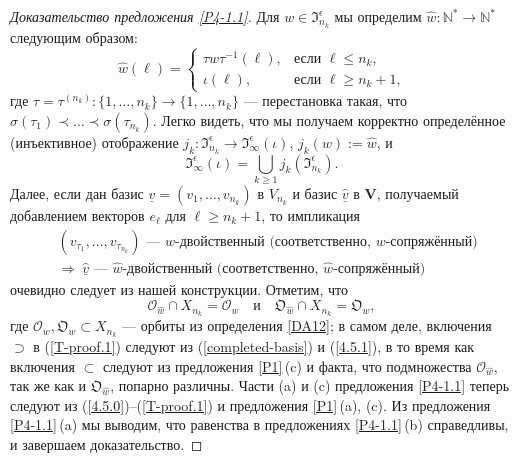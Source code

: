 \documentclass{amsart}
\theoremstyle{definition}
\newcommand{\bs}[1]{\boldsymbol{#1}}
\begin{document}
\begin{proof}[Доказательство предложения \ref{P4-1.1}]
Для $w\in\mathfrak{I}_{n_k}^\epsilon$ мы определим $\hat{w}:\mathbb{N}^*\to\mathbb{N}^*$ следующим образом:
\[\hat{w}(\ell)=\left\{
\begin{array}{ll}
\tau w\tau^{-1}(\ell), & \mbox{если $\ell\leq n_k$,} \\
\iota(\ell), & \mbox{если $\ell\geq n_k+1$,}
\end{array}
\right.\]
где $\tau=\tau^{(n_k)}:\{1,\ldots,n_k\}\to\{1,\ldots,n_k\}$ --- перестановка такая, что $\sigma(\tau_1)\prec\ldots\prec\sigma(\tau_{n_k})$.
Легко видеть, что мы получаем корректно определённое (инъективное) отображение
$j_k:\mathfrak{I}_{n_k}^\epsilon\to\mathfrak{I}_\infty^\epsilon(\iota)$, $j_k(w):=\hat{w}$,
и
\begin{equation}
\label{4.5.0}
\mathfrak{I}_\infty^\epsilon(\iota)=\bigcup_{k\geq 1}j_k(\mathfrak{I}_{n_k}^\epsilon).\end{equation}
Далее, если
дан базис $\underline{v}=(v_1,\ldots,v_{n_k})$ в $V_{n_k}$ и
базис $\underline{\hat{v}}$ в $\mathbf{V}$, получаемый добавлением векторов $e_\ell$ для $\ell\geq n_k+1$,
то импликация
\begin{eqnarray}
\label{4.5.1}
 & \mbox{$(v_{\tau_1},\ldots,v_{\tau_{n_k}})$ --- $w$-двойственный (соответственно, $w$-сопряжённый)} \\
\nonumber
 & \Rightarrow \
\mbox{$\underline{\hat{v}}$ --- $\hat{w}$-двойственный (соответственно, $\hat{w}$-сопряжённый)}
\end{eqnarray}
очевидно следует из нашей конструкции.
Отметим, что
\begin{equation}
\label{T-proof.1}
\bs{\mathcal{O}}_{\hat{w}}\cap X_{n_k}=\mathcal{O}_{w}
\quad
\mbox{и}
\quad
\bs{\mathfrak{O}}_{\hat{w}}\cap X_{n_k}=\mathfrak{O}_{w},
\end{equation}
где $\mathcal{O}_w,\mathfrak{O}_w\subset X_{n_k}$ --- орбиты из  определения \ref{DA12};
в самом деле, включения $\supset$ в (\ref{T-proof.1}) следуют из
(\ref{completed-basis}) и (\ref{4.5.1}),
в то время как включения $\subset$ следуют из
предложения \ref{P1}\,{\rm (c)}
и факта, что подмножества $\bs{\mathcal{O}}_{\hat{w}}$, так же как и $\bs{\mathfrak{O}}_{\hat{w}}$,
попарно различны.
Части {\rm (a)} и {\rm (c)} предложения \ref{P4-1.1} теперь следуют
из (\ref{4.5.0})--(\ref{T-proof.1}) и предложения \ref{P1}\,{\rm (a)}, {\rm (c)}. Из предложения \ref{P4-1.1}\,{\rm (a)} мы выводим, что равенства в предложениях \ref{P4-1.1}\,{\rm (b)} справедливы, и завершаем доказательство.
\end{proof}
\end{document}
